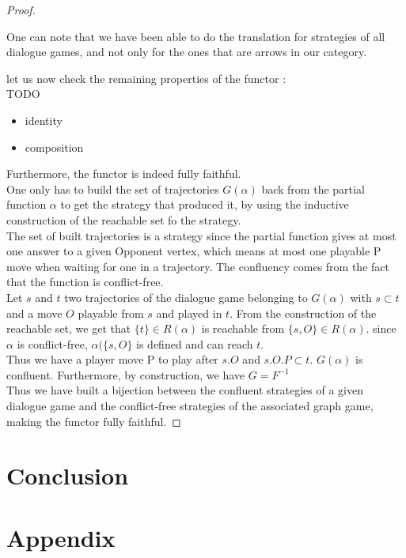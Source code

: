 \documentclass[a4paper,UKenglish]{lipics}
\begin{document}
\begin{proof}
\begin{itemize}
One can note that we have been able to do the translation for strategies of all dialogue games, and not only for the ones that are arrows in our category.\\

\end{itemize}
let us now check the remaining properties of the functor : \\ TODO

\begin{itemize}
\item identity 
\item composition
\end{itemize}
Furthermore, the functor is indeed fully faithful.\\
 One only has to build the set of trajectories $G(\alpha)$ back from the partial function $\alpha$ to get the strategy that produced it, by using the inductive construction of the reachable set fo the strategy.\\
 The set of built trajectories is a strategy since the partial function gives at most one answer to a given Opponent vertex, which means at most one playable P  move when waiting for one in a trajectory. The confluency comes from the fact that the function is conflict-free. \\Let $s$ and $t$ two trajectories of the dialogue game belonging to $G(\alpha)$  with $s \subset t$ and a move $O$ playable from $s$ and played in $t$. From the construction of the reachable set, we get that $\{t\} \in R(\alpha)$ is reachable from $\{s,O\} \in R(\alpha)$. since $\alpha$ is conflict-free,  $\alpha(\{s,O\}$ is defined and can reach $t$. \\Thus we have a player move P to play after $s.O$ and  $s.O.P \subset t$. $G(\alpha)$ is confluent. Furthermore, by construction, we have $G=F^{-1}$  \\



Thus we have built a bijection between the confluent strategies of a given dialogue game and the conflict-free strategies of the associated graph game, making the functor fully faithful.


\end{proof}



\section*{Conclusion}





\clearpage

\section*{Appendix}
\end{document}
